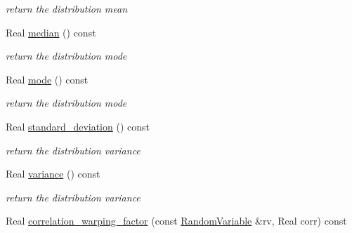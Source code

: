 \begin{DoxyCompactItemize}
\begin{DoxyCompactList}\small\item\em return the distribution mean \end{DoxyCompactList}\item 
Real \hyperlink{classPecos_1_1InvGammaRandomVariable_ae1fff19ce29a79d657043a598523635d}{median} () const \label{classPecos_1_1InvGammaRandomVariable_ae1fff19ce29a79d657043a598523635d}

\begin{DoxyCompactList}\small\item\em return the distribution mode \end{DoxyCompactList}\item 
Real \hyperlink{classPecos_1_1InvGammaRandomVariable_a72d3d6926edd929cb3f8e12baa655f70}{mode} () const \label{classPecos_1_1InvGammaRandomVariable_a72d3d6926edd929cb3f8e12baa655f70}

\begin{DoxyCompactList}\small\item\em return the distribution mode \end{DoxyCompactList}\item 
Real \hyperlink{classPecos_1_1InvGammaRandomVariable_a6a4ed9624d511f8a4e4f509c82cb0706}{standard\+\_\+deviation} () const \label{classPecos_1_1InvGammaRandomVariable_a6a4ed9624d511f8a4e4f509c82cb0706}

\begin{DoxyCompactList}\small\item\em return the distribution variance \end{DoxyCompactList}\item 
Real \hyperlink{classPecos_1_1InvGammaRandomVariable_a4b8b05b2a9af92dad9cc304c2925a4eb}{variance} () const \label{classPecos_1_1InvGammaRandomVariable_a4b8b05b2a9af92dad9cc304c2925a4eb}

\begin{DoxyCompactList}\small\item\em return the distribution variance \end{DoxyCompactList}\item 
Real \hyperlink{classPecos_1_1InvGammaRandomVariable_a9ee48b3ca93459136b2e73f77873c4aa}{correlation\+\_\+warping\+\_\+factor} (const \hyperlink{classPecos_1_1RandomVariable}{Random\+Variable} \&rv, Real corr) const \label{classPecos_1_1InvGammaRandomVariable_a9ee48b3ca93459136b2e73f77873c4aa}


\end{DoxyCompactItemize}

